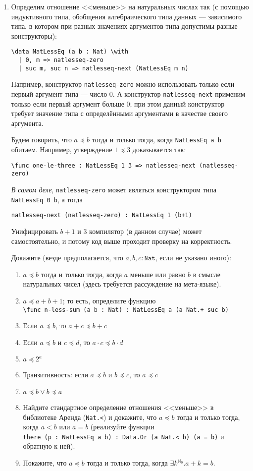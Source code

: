 \documentclass[10pt,a4paper,oneside]{article}
\begin{document}
\begin{enumerate}
\item Определим отношение <<меньше>> на натуральных числах так (с помощью индуктивного типа, обобщения алгебраического типа данных ---
зависимого типа, в котором при разных значениях аргументов типа допустимы разные конструкторы):
\begin{verbatim}
\data NatLessEq (a b : Nat) \with
  | 0, m => natlesseq-zero
  | suc m, suc n => natlesseq-next (NatLessEq m n)
\end{verbatim}

Например, конструктор \verb!natlesseq-zero! можно использовать только если первый аргумент типа --- число 0.
А конструктор \verb!natlesseq-next! применим только если первый аргумент больше 0; при этом данный конструктор
требует значение типа с определёнными аргументами в качестве своего аргумента.

Будем говорить, что $a \preceq b$ тогда и только тогда, когда \verb!NatLessEq a b! обитаем.
Например, утверждение $1 \preceq 3$ доказывается так:

\begin{center}\verb!\func one-le-three : NatLessEq 1 3 => natlesseq-next (natlesseq-zero)!\end{center}

\emph{В самом деле}, \verb!natlesseq-zero! может являться конструктором типа \verb!NatLessEq 0 b!,
а тогда \begin{center}\verb!natlesseq-next (natlesseq-zero) : NatLessEq 1 (b+1)!\end{center} Унифицировать $b+1$ и $3$
компилятор (в данном случае) может самостоятельно, и потому код выше проходит проверку на корректность.

Докажите (везде предполагается, что $a,b,c : \texttt{Nat}$, если не указано иного):
\begin{enumerate}
\item $a \preceq b$ тогда и только тогда, когда $a$ меньше или равно $b$ в смысле натуральных чисел (здесь требуется рассуждение
на мета-языке).
\item $a \preceq a + b + 1$; то есть, определите функцию\\\verb!\func n-less-sum (a b : Nat) : NatLessEq a (a Nat.+ suc b)!
\item Если $a \preceq b$, то $a + c \preceq b + c$
\item Если $a \preceq b$ и $c \preceq d$, то $a \cdot c \preceq b \cdot d$
\item $a \preceq 2^a$
\item Транзитивность: если $a \preceq b$ и $b \preceq c$, то $a \preceq c$
\item $a \preceq b \vee b \preceq a$
\item Найдите стандартное определение отношения <<меньше>> в библиотеке Аренда (\verb!Nat.<!) и докажите, что $a \preceq b$ 
тогда и только тогда, когда $a < b$ или $a = b$ (реализуйте функции \\\verb!there (p : NatLessEq a b) : Data.Or (a Nat.< b) (a = b)!
и обратную к ней).
\item Покажите, что $a \preceq b$ тогда и только тогда, когда $\exists k^{\mathbb{N}_0}.a + k = b$.
\end{enumerate}


\end{enumerate}
\end{document}
